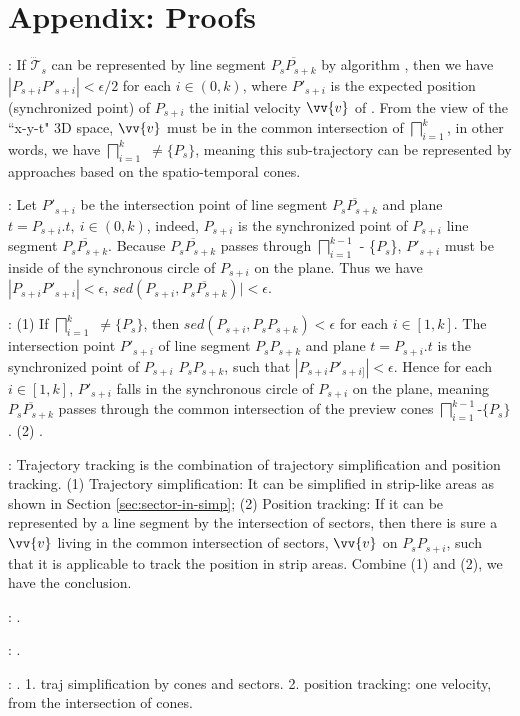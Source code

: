 \section*{{Appendix:  Proofs}}





:
If $\dddot{\mathcal{T}}_s$ can be represented by line segment $\overline{P_sP_{s+k}}$ by algorithm \ldrh, then we have $|P_{s+i}P'_{s+i}| < \epsilon/2$ for each $i \in (0, k)$, where $P'_{s+i}$ is the expected position (synchronized point) of $P_{s+i}$ \wrt the initial velocity $\vv{v}$ of \ldrh.
From the view of the ``x-y-t" 3D space, $\vv{v}$ must be in the common intersection of  $\bigsqcap_{i=1}^{k}$, in other words, we have $\bigsqcap_{i=1}^{k}$ $\ne \{P_s\}$, meaning this sub-trajectory can be represented by approaches based on the spatio-temporal cones.
\eop

:
Let $P'_{s+i}$ be the intersection point of line segment $\overline{P_sP_{s+k}}$ and plane $t = P_{s+i}.t,~i\in (0,k)$, indeed, $P_{s+i}$ is the synchronized point of $P_{s+i}$ \wrt line segment $\overline{P_sP_{s+k}}$. 
Because $\overline{P_sP_{s+k}}$ passes through $\bigsqcap_{i=1}^{k-1}$ - \{$P_s$\}, $P'_{s+i}$ must be inside of the synchronous circle of $P_{s+i}$ on the plane. Thus we have $|P_{s+i}P'_{s+i}|<\epsilon$, \ie $sed(P_{s+i}, \overline{P_sP_{s+k}})|<\epsilon$.
\eop

:
(1) If $\bigsqcap_{i=1}^{k}$ $\ne \{P_s\}$, then $sed(P_{s+i}, P_sP_{s+k}) <\epsilon$ for each $i \in [1,k]$. 
The intersection point  $P'_{s+i}$ of line segment $P_s P_{s+k}$ and plane $t = P_{s+i}.t$ is the synchronized point of $P_{s+i}$ \wrt $P_s P_{s+k}$, such that $|P_{s+i}P'_{s+i]}| < \epsilon$. Hence for each $i \in [1,k]$, $P'_{s+i}$ falls in the synchronous circle of $P_{s+i}$ on the plane, meaning $\overline{P_sP_{s+k}}$ passes through the common intersection of the preview cones $\bigsqcap_{i=1}^{k-1}$-$\{P_s\}$.
%
(2) \todo.
\eop

:
Trajectory tracking is the combination of trajectory simplification and position tracking.
%
(1) Trajectory simplification: It can be simplified in strip-like areas as shown in Section \ref{sec:sector-in-simp};
%
(2) Position tracking: If it can be represented by a line segment by the intersection of sectors, then there is sure a $\vv{v}$ living in the common intersection of sectors, \eg $\vv{v}$ on $P_sP_{s+i}$, such that it is applicable to track the position in strip areas.
%
Combine (1) and (2), we have the conclusion.
\eop

:
\todo.
\eop

:
\todo.
\eop

:
\todo.
1. traj simplification by cones and sectors.
2. position tracking: one velocity, from the intersection of cones.
\eop


